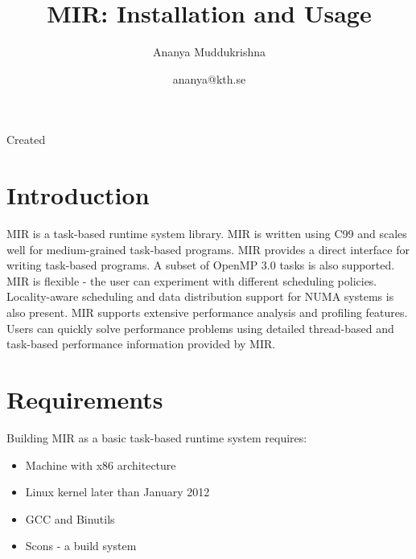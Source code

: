 \documentclass[11pt,a4paper,notitlepage]{article}
\title{MIR: Installation and Usage}
\author{Ananya Muddukrishna}
\date{ananya@kth.se}
\begin{document}
\maketitle

\begin{versionhistory}
 {Created}
\end{versionhistory}

\section{Introduction}
MIR is a task-based runtime system library.
MIR is written using C99 and scales well for medium-grained task-based programs. 
MIR provides a direct interface for writing task-based programs.
A subset of OpenMP 3.0 tasks is also supported.
MIR is flexible - the user can experiment with different scheduling policies.
Locality-aware scheduling and data distribution support for NUMA systems is also present.
MIR supports extensive performance analysis and profiling features.
Users can quickly solve performance problems using detailed thread-based and task-based performance information provided by MIR.

\section{Requirements}
Building MIR as a basic task-based runtime system requires:
\begin{itemize}
\item Machine with x86 architecture
\item Linux kernel later than January 2012
\item GCC and Binutils
\item Scons - a build system
\end{itemize}
\end{document}
